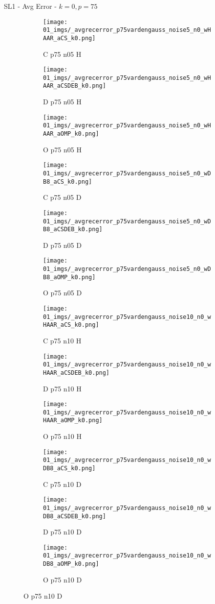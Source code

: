 \begin{frame}{SL1 - Avg Error - $k=0,p=75$}{}
\begin{figure}
\begin{subfigure}{0.13\textwidth}
\texttt{[image: 01\_imgs/\_avgrecerror\_p75vardengauss\_noise5\_n0\_wHAAR\_aCS\_k0.png]}
\caption*{\tiny C p75 n05 H}
\end{subfigure}
\begin{subfigure}{0.13\textwidth}
\texttt{[image: 01\_imgs/\_avgrecerror\_p75vardengauss\_noise5\_n0\_wHAAR\_aCSDEB\_k0.png]}
\caption*{\tiny D p75 n05 H}
\end{subfigure}
\begin{subfigure}{0.13\textwidth}
\texttt{[image: 01\_imgs/\_avgrecerror\_p75vardengauss\_noise5\_n0\_wHAAR\_aOMP\_k0.png]}
\caption*{\tiny O p75 n05 H}
\end{subfigure}
\begin{subfigure}{0.13\textwidth}
\texttt{[image: 01\_imgs/\_avgrecerror\_p75vardengauss\_noise5\_n0\_wDB8\_aCS\_k0.png]}
\caption*{\tiny C p75 n05 D}
\end{subfigure}
\begin{subfigure}{0.13\textwidth}
\texttt{[image: 01\_imgs/\_avgrecerror\_p75vardengauss\_noise5\_n0\_wDB8\_aCSDEB\_k0.png]}
\caption*{\tiny D p75 n05 D}
\end{subfigure}
\begin{subfigure}{0.13\textwidth}
\texttt{[image: 01\_imgs/\_avgrecerror\_p75vardengauss\_noise5\_n0\_wDB8\_aOMP\_k0.png]}
\caption*{\tiny O p75 n05 D}
\end{subfigure}

\vspace{5pt}

\begin{subfigure}{0.13\textwidth}
\texttt{[image: 01\_imgs/\_avgrecerror\_p75vardengauss\_noise10\_n0\_wHAAR\_aCS\_k0.png]}
\caption*{\tiny C p75 n10 H}
\end{subfigure}
\begin{subfigure}{0.13\textwidth}
\texttt{[image: 01\_imgs/\_avgrecerror\_p75vardengauss\_noise10\_n0\_wHAAR\_aCSDEB\_k0.png]}
\caption*{\tiny D p75 n10 H}
\end{subfigure}
\begin{subfigure}{0.13\textwidth}
\texttt{[image: 01\_imgs/\_avgrecerror\_p75vardengauss\_noise10\_n0\_wHAAR\_aOMP\_k0.png]}
\caption*{\tiny O p75 n10 H}
\end{subfigure}
\begin{subfigure}{0.13\textwidth}
\texttt{[image: 01\_imgs/\_avgrecerror\_p75vardengauss\_noise10\_n0\_wDB8\_aCS\_k0.png]}
\caption*{\tiny C p75 n10 D}
\end{subfigure}
\begin{subfigure}{0.13\textwidth}
\texttt{[image: 01\_imgs/\_avgrecerror\_p75vardengauss\_noise10\_n0\_wDB8\_aCSDEB\_k0.png]}
\caption*{\tiny D p75 n10 D}
\end{subfigure}
\begin{subfigure}{0.13\textwidth}
\texttt{[image: 01\_imgs/\_avgrecerror\_p75vardengauss\_noise10\_n0\_wDB8\_aOMP\_k0.png]}
\caption*{\tiny O p75 n10 D}
\end{subfigure}


\end{figure}
\end{frame}
